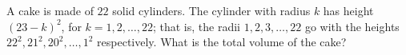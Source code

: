 A cake is made of $22$ solid cylinders. The cylinder with radius $k$ has height $(23-k)^2$, for $k=1,2,\dots,22$; that is, the radii $1,2,3,\dots,22$ go with the heights $22^2,21^2,20^2,\dots,1^2$ respectively. What is the total volume of the cake?
